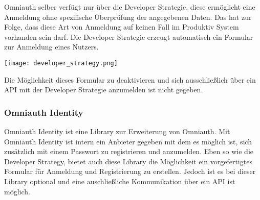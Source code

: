 \documentclass[11pt]{article}
\newcommand{\hlnote}[2]{#1}
\newcommand{\hlnote}[2]{\todo{#2}\texthl{#1}}
\begin{document}
\begin{flushleft}
			Omniauth selber verfügt nur über die Developer Strategie, diese ermöglicht eine Anmeldung ohne spezifische Überprüfung der angegebenen Daten. Das hat zur Folge, dass diese Art von Anmeldung auf keinen Fall im Produktiv System vorhanden sein darf. Die Developer Strategie erzeugt automatisch ein \hlnote{Formular zur Anmeldung eines Nutzers}{Das Formular als solches ist nicht relevant}.

			\begin{center}
				\texttt{[image: developer\_strategy.png]}
			\end{center}

			Die Möglichkeit dieses Formular zu deaktivieren und sich ausschließlich über ein API mit der Developer Strategie anzumelden ist nicht gegeben.\par\bigskip


			\subsubsection{Omniauth Identity}
			\label{sec: omniauth_identity}
			Omniauth Identity ist eine Library zur Erweiterung von Omniauth. Mit Omniauth Identity ist intern ein Anbieter gegeben mit dem es möglich ist, sich zusätzlich mit einem Passwort zu registrieren und anzumelden. Eben so wie die Developer Strategy, bietet auch diese Library die Möglichkeit ein vorgefertigtes Formular für Anmeldung und Registrierung zu erstellen. Jedoch ist es bei dieser Library optional und eine auschließliche Kommunikation über ein API ist möglich.\par\bigskip



		\end{flushleft}
\end{document}
